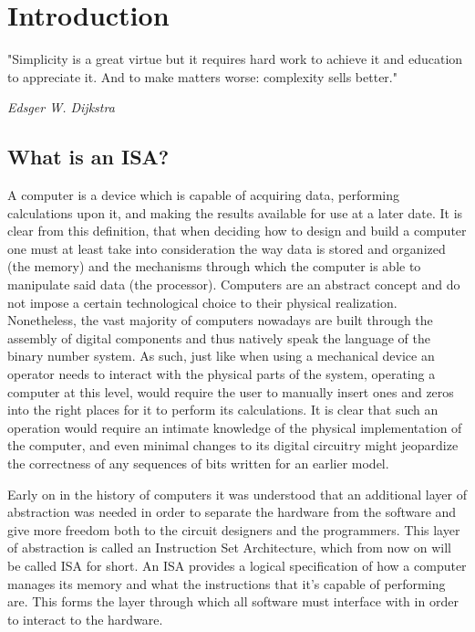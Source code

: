 \chapter{Introduction}
\epigraph{"Simplicity is a great virtue but it requires hard work to achieve it and education to appreciate it. And to make matters worse: complexity sells better."}{\textit{Edsger W. Dijkstra}}

\section*{What is an ISA?}

A computer is a device which is capable of acquiring data, performing calculations upon it, and making the results available for use at a later date.
It is clear from this definition, that when deciding how to design and build a computer one must at least take into consideration the way data is 
stored and organized (the memory) and the mechanisms through which the computer is able to manipulate said data (the processor).
Computers are an abstract concept and do not impose a certain technological choice to their physical realization. Nonetheless, the vast majority of computers nowadays
are built through the assembly of digital components and thus natively speak the language of the binary number system.
As such, just like when using a mechanical device an operator needs to interact with the physical parts of the system,  operating a computer at this level,
would require the user to manually insert ones and zeros into the right places for it to perform its calculations.
It is clear that such an operation would require an intimate knowledge of the physical implementation of the computer, and even minimal
changes to its digital circuitry might jeopardize the correctness of any sequences of bits written for an earlier model.

Early on in the history of computers it was understood that an additional layer of abstraction was needed in order to separate the hardware from the software
and give more freedom both to the circuit designers and the programmers. This layer of abstraction is called an Instruction Set Architecture,
which from now on will be called ISA for short. An ISA provides a logical specification of how a computer manages its memory and what the instructions that it's
capable of performing are. This forms the layer through which all software must interface with in order to interact to the hardware.


